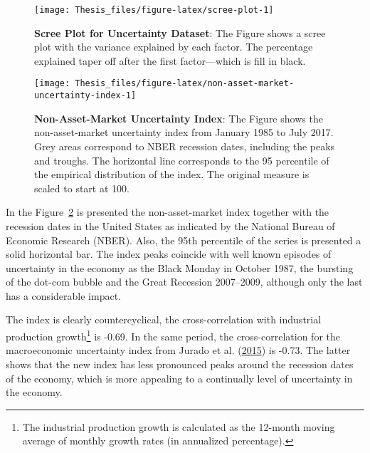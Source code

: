 \documentclass[12pt,twoside]{reedthesis}
\begin{document}
\begin{figure}

{\centering \texttt{[image: Thesis\_files/figure-latex/scree-plot-1]} 

}

\caption[Scree Plot for Uncertainty Dataset]{\textbf{Scree Plot for Uncertainty Dataset}: The Figure shows a scree plot with the variance explained by each factor. The percentage explained taper off after the first factor---which is fill in black.}\label{fig:scree-plot}
\end{figure}

\begin{figure}

{\centering \texttt{[image: Thesis\_files/figure-latex/non-asset-market-uncertainty-index-1]} 

}

\caption[Non-Asset-Market Uncertainty Index]{\textbf{Non-Asset-Market Uncertainty Index}: The Figure shows the non-asset-market uncertainty index from January 1985 to July 2017. Grey areas correspond to NBER recession dates, including the peaks and troughs. The horizontal line corresponds to the 95 percentile of the empirical distribution of the index. The original measure is scaled to start at 100.}\label{fig:non-asset-market-uncertainty-index}
\end{figure}
In the Figure~\ref{fig:non-asset-market-uncertainty-index} is presented the non-asset-market index together with the recession dates in the United States as indicated by the National Bureau of Economic Research (NBER). Also, the 95th percentile of the series is presented a solid horizontal bar. The index peaks coincide with well known episodes of uncertainty in the economy as the Black Monday in October 1987, the bursting of the dot-com bubble and the Great Recession 2007--2009, although only the last has a considerable impact.

The index is clearly countercyclical, the cross-correlation with industrial production growth\footnote{The industrial production growth is calculated as the 12-month moving average of monthly growth rates (in annualized percentage).} is -0.69. In the same period, the cross-correlation for the macroeconomic uncertainty index from Jurado et al. (\protect\hyperlink{ref-juraetal:2015}{2015}) is -0.73. The latter shows that the new index has less pronounced peaks around the recession dates of the economy, which is more appealing to a continually level of uncertainty in the economy.
\end{document}
